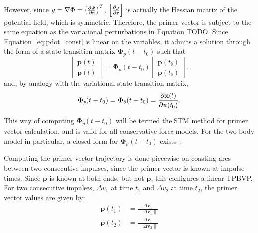 However, since \(g = \nabla \Phi = \left(\frac{\partial \Phi}{\partial \mathbf{r}}\right)^T\), \(\left[\frac{\partial g}{\partial \mathbf{r}}\right]\) is actually the Hessian matrix of the potential field, which is symmetric. Therefore, the primer vector is subject to the same equation as the variational perturbations in Equation TODO\@. Since Equation~\eqref{eq:pdot_const} is linear on the variables, it admits a solution through the form of a state transition matrix \(\mathbf{\Phi}_p(t - t_0)\) such that
\begin{equation}
    \begin{bmatrix}
        \mathbf{p}(t) \\ \dot{\mathbf{p}}(t)
    \end{bmatrix} = \mathbf{\Phi}_p(t - t_0) \begin{bmatrix}
        \mathbf{p}(t_0) \\ \dot{\mathbf{p}}(t_0)
    \end{bmatrix}.
\end{equation}
and, by analogy with the variational state transition matrix, 
\begin{equation}
    \mathbf{\Phi}_p(t - t_0) = \mathbf{\Phi}_\delta(t - t_0) = \frac{\partial \mathbf{x}(t)}{\partial \mathbf{x}(t_0)}.
\end{equation}

This way of computing \(\mathbf{\Phi}_p(t - t_0)\) will be termed the STM method for primer vector calculation, and is valid for all conservative force models. For the two body model in particular, a closed form for \(\mathbf{\Phi}_p(t-t_0)\) exists~\cite{glandorf_transition_matrix}. 

Computing the primer vector trajectory is done piecewise on coasting arcs between two consecutive impulses, since the primer vector is known at impulse times. Since \(\mathbf{p}\) is known at both ends, but not \(\dot{\mathbf{p}}\), this configures a linear TPBVP\@. For two consecutive impulses, \(\Delta v_1\) at time \(t_1\) and \(\Delta v_2\) at time \(t_2\), the primer vector values are given by:
\begin{align}\label{eq:pv_deltav}
    \mathbf{p}(t_1) &= \frac{\Delta \mathbf{v}_1}{\lVert \Delta \mathbf{v}_1 \rVert} \\
    \mathbf{p}(t_2) &= \frac{\Delta \mathbf{v}_1}{\lVert \Delta \mathbf{v}_2 \rVert}
\end{align}

